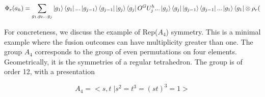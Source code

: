 \documentclass{article}
\theoremstyle{definition}
\begin{document}
\begin{align}
    \Phi_r(a_h) =  \sum_{g_1,g_2,..g_j}\ket{g_1}\bra{g_1} ...\ket{g_{j-1}}\bra{g_{j-1}}\ket{g_j}\bra{g_j} O^GU^h_{j}... \ket{g_j}\bra{g_j} \ket{g_{j-1}}\bra{g_{j-1}}...\ket{g_1}\bra{g_1} \otimes \rho_r(
\end{align}




For concreteness, we discuss the example of Rep($A_4$) symmetry.  This is a minimal example where the fusion outcomes can have multiplicity greater than one.  The group $A_4$ corresponds to the group of even permutations on four elements.  Geometrically, it is the symmetries of a regular tetrahedron. The group is of order 12, with a presentation

\begin{equation}
    A_4 = <s,t\;|s^2 = t^3 = (st)^3 = 1>
\end{equation}
\end{document}
